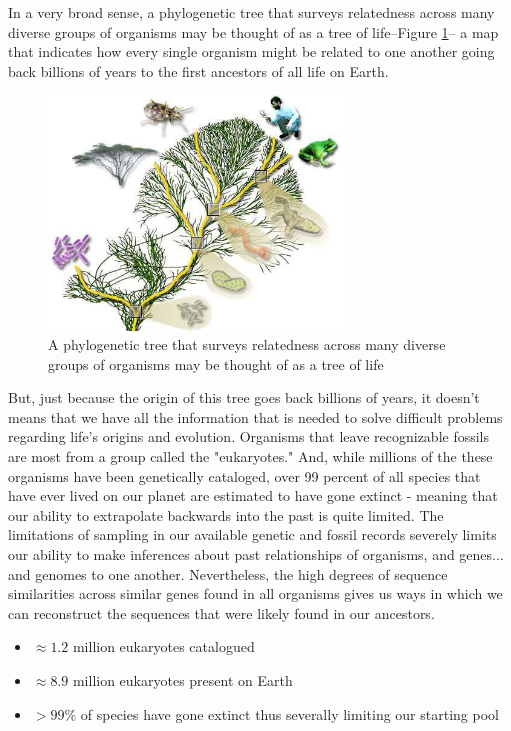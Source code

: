 \documentclass[]{article}
\begin{document}
In a very broad sense,
a phylogenetic tree
that surveys relatedness
across many diverse groups
of organisms
may be thought of as a tree of life--Figure \ref{fig:TOL-5-3}--
a map that indicates
how every single organism
might be related to one another
going back billions of years to
the first ancestors of all life on Earth.

\begin{figure}[H]
	\begin{center}
		\caption[A phylogenetic tree may be thought of as a tree of life]{A phylogenetic tree that surveys relatedness across many diverse groups
			of organisms may be thought of as a tree of life}\label{fig:TOL-5-3}
		\includegraphics[width=0.7\textwidth]{TOL-5-3}
	\end{center}
\end{figure}


But, just because the origin of this tree
goes back billions of years,
it doesn't means that we have
all the information that is needed
to solve difficult problems
regarding life's origins and evolution.
Organisms that leave
recognizable fossils
are most from a group
called the "eukaryotes."
And, while millions of the these organisms
have been genetically cataloged,
over 99 percent of all species
that have ever lived on our planet
are estimated to have gone extinct -
meaning that our ability to extrapolate
backwards into the past is quite limited.
The limitations of sampling in our
available genetic and fossil records
severely limits our ability
to make inferences
about past relationships of organisms,
and genes... and genomes
to one another.
Nevertheless, the high degrees
of sequence similarities
across similar genes
found in all organisms
gives us ways in which we can
reconstruct the sequences
that were likely found in our ancestors.

\begin{itemize}
	\item $\approx 1.2$ million eukaryotes catalogued
	\item $\approx 8.9$ million eukaryotes present on Earth
	\item $>99\%$ of species have gone extinct thus severally limiting our starting pool
\end{itemize}
\end{document}
